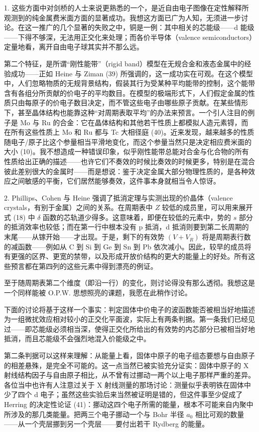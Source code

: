 1. 这些方面中对剑桥的人士来说更熟悉的一个，是近自由电子图像在定性解释所观测到的纯金属费米面方面的显著成功。我想这方面已广为人知，无须进一步讨论。在这一推广的几个显著的失败之中，铜是一例：其中相关的芯能级——d 能级——下得不够深，无法用正交化来处理；而各价半导体（valence semiconductors）定量地看，离开自由电子球其实并不那么远。

第二个特征，是所谓“刚性能带”（rigid band）模型在无规合金和液态金属中的经验成功——正如 Heine 与 Ziman (39) 所强调的，这一成功实在可观。在这个模型中，人们忽略物质的无规背景结构，假装其行为受某种平均能带的控制，这个能带含有各组分所贡献的价电子的平均数目。在模型的极端形式下，人们假定金属的性质只由每原子的价电子数目决定，而不管这些电子由哪些原子贡献。在某些情形下，甚至晶体结构也能靠这种“对周期表取平均”的办法来预言。一个引人注目的例子是 Mo 与 Ru 的合金：它在晶体结构和其他若干性质上都模拟人造元素锝，而在所有这些性质上 Mo 和 Ru 都与 Tc 大相径庭 (40)。近来发现，越来越多的性质随电子/原子比这个参量相当平滑地变化，而这个参量当然只是决定相应费米面的大小 (10)。我不想造成一种错误印象，似乎刚性能带总能对合金与化合物的所有性质给出正确的描述——也许它们不奏效的时候比奏效的时候更多，特别是在混合彼此差别很大的金属时——而是想说：鉴于决定金属大部分物理性质的，是各种效应之间敏感的平衡，它们居然能够奏效，这件事本身就相当令人惊讶。

2. Phillips、Cohen 与 Heine 强调了抵消定理与实测出现的价晶体（valence crystals，有别于金属）之间的关系。在周期表中 $Z$ 较低的成员里，可以用来展开式 (18) 中 $\delta$ 函数的芯轨道少得多。这意味着，即便在较低的元素中，势的 $s$ 部分的抵消效率也较低；而在第一行中根本没有 p 抵消，d 抵消则要到第二长周期的末尾——从镓开始——才出现。于是，剩下的有效势 $(V + V_R)$ 将是周期表行数的减函数——例如从 C 到 Si 到 Ge 到 Sn 到 Pb 依次减小。因此，较早的成员将有更强的区界、更宽的禁带，以及形成开放价结构的更大的能量上的好处。所有这些预言都在第四列的这些元素中得到漂亮的例证。

至于随周期表第二个维度（即沿一行）的变化，则讨论得没有那么透彻。我想这是一个同样能被 O.P.W. 思想照亮的课题，我愿在此稍作讨论。

下面的讨论将基于这样一个事实：判定固体中价电子的波函数能否被相当好地描述为一组微扰效应相对较小的正交化平面波，实际上有两条判据。第一条我们已经见过——即芯能级必须相当深，使得正交化所给出的有效势的内芯部分已被相当好地抵消，而且芯能级不会强烈地混入价能级之中。

第二条判据可以这样来理解：从能量上看，固体中原子的电子组态要想与自由原子的相差悬殊，是完全不可能的。这一点当然已被实验充分证实：固体中原子的 X 射线结构因子与自由原子相比，从不曾有过挪动一两个以上电子那样严重的差异。各位当中也许有人注意过关于 X 射线测量的那场讨论：测量似乎表明铁在固体中少了四个 d 电子；虽然这些实验后来当然被证明是错的，但这件事至少促成了 Herring 的决定性论证 (41)：挪动这四个电子所需的能量，根本不可能来自内聚中所涉及的那几类能量。把两三个电子挪动一个与 Bohr 半径 $a_0$ 相比可观的数量——从一个壳层挪到另一个壳层——要付出若干 Rydberg 的能量。

